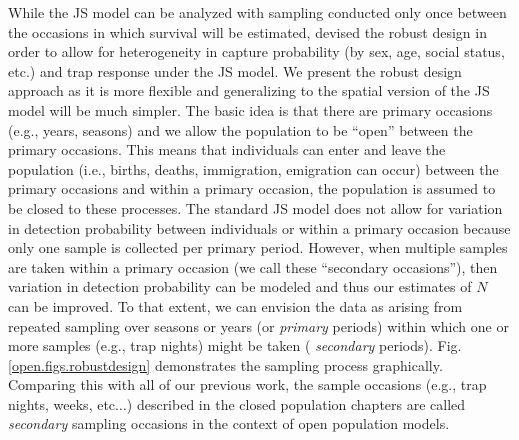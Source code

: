 While the JS model can be analyzed with sampling conducted only once
between the occasions in which survival will be estimated,
\citet{pollock:1982} devised
 the robust design in order to allow for
heterogeneity in capture probability (by sex, age, social status, etc.) and
trap response under the JS model.  
We present
the robust design approach as it is more flexible and generalizing to
the spatial version of the JS model will be much simpler.  The basic
idea is that there are primary occasions (e.g., years, seasons) and we
allow the population to be ``open'' between the primary occasions.
This means that individuals can enter and leave the population (i.e.,
births, deaths, immigration, emigration can occur) between the primary
occasions and within a primary occasion, the population is assumed to
be closed to these processes.  The standard JS model does not allow
for variation in detection probability between individuals or within a
primary occasion because only one sample is collected per primary
period.  However, when multiple samples are taken within a primary
occasion (we call these ``secondary occasions''), then variation in
detection probability can be modeled and thus our estimates of $N$ can
be improved.  To that extent, we can envision the data as arising from
repeated sampling over seasons or years (or {\it primary} periods)
within which one or more samples (e.g., trap nights) might be taken ({\it
  secondary} periods). Fig. \ref{open.figs.robustdesign} demonstrates
the sampling process graphically.  Comparing this with all of our
previous work, the sample occasions 
(e.g., trap nights, weeks, etc$\dots$) described in the closed
population chapters are called {\it secondary} sampling occasions in the context of open population models.



